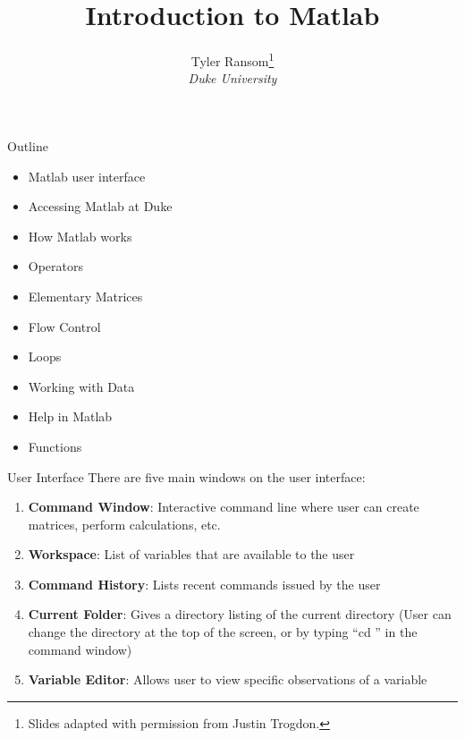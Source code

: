 \documentclass[english,xcolor=dvipsnames]{beamer}
\begin{document}
\begin{frame}
\title{Introduction to Matlab}
\author{
	Tyler Ransom\thanks{Slides adapted with permission from Justin Trogdon.}\\
	\emph{Duke University}\\
}
\titlepage
\end{frame}

\begin{frame}{Outline}
\begin{itemize}
	\item Matlab user interface
	\item Accessing Matlab at Duke
	\item How Matlab works
	\item Operators
	\item Elementary Matrices
	\item Flow Control
	\item Loops
	\item Working with Data
	\item Help in Matlab
	\item Functions
\end{itemize}
\end{frame}

\begin{frame}{User Interface}
There are five main windows on the user interface:
	\begin{enumerate}
		\item \textbf{Command Window}: Interactive command line where user can create matrices, perform calculations, etc.
		\item \textbf{Workspace}: List of variables that are available to the user
		\item \textbf{Command History}: Lists recent commands issued by the user
		\item \textbf{Current Folder}: Gives a directory listing of the current directory (User can change the directory at the top of the screen, or by typing ``cd '' in the command window)
		\item \textbf{Variable Editor}: Allows user to view specific observations of a variable
	\end{enumerate}
\end{frame}
\end{document}
